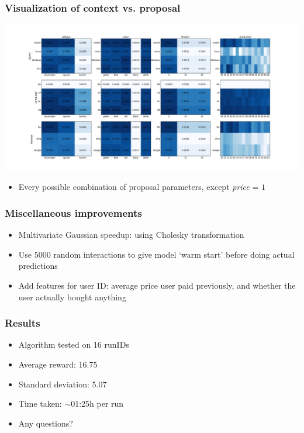 \documentclass{beamer}
\begin{document}
\begin{frame}
	\frametitle{Visualization of context vs. proposal}
	\includegraphics[width=\textwidth]{viewer.png}
	\begin{itemize}
		\item Every possible combination of proposal parameters, except \emph{price} = $1$
	\end{itemize}
\end{frame}


\begin{frame}
	\frametitle{Miscellaneous improvements}
	\begin{itemize}
		\item<1,4> Multivariate Gaussian speedup: using Cholesky transformation
		\item<2,4> Use 5000 random interactions to give model `warm start' before doing actual predictions
		\item<3,4 | alert@4> Add features for user ID: average price user paid previously, and whether the user actually bought anything
	\end{itemize}
\end{frame}


\begin{frame}
  \frametitle{Results}

  \begin{itemize}
    \item Algorithm tested on 16 runIDs
   	\item Average reward: 16.75
    \item Standard deviation: 5.07‏
    \item Time taken: $\sim$01:25h per run
    \item Any questions?
  \end{itemize}
\end{frame}
\end{document}
